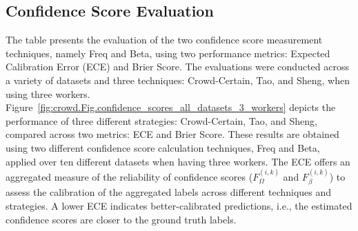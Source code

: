 \documentclass[default]{bst/sn-jnl_mine}%
\begin{document}
\subsection{Confidence Score Evaluation}
The table presents the evaluation of the two confidence score measurement techniques, namely Freq and Beta, using two performance metrics: Expected Calibration Error (ECE) and Brier Score. The evaluations were conducted across a variety of datasets and three techniques: Crowd-Certain, Tao, and Sheng, when using three workers.
Figure~\ref{fig:crowd.Fig.confidence_scores_all_datasets_3_workers} depicts the performance of three different strategies: Crowd-Certain, Tao, and Sheng, compared across two metrics: ECE and Brier Score. These results are obtained using two different confidence score calculation techniques, Freq and Beta, applied over ten different datasets when having three workers. The ECE offers an aggregated measure of the reliability of confidence scores ($F_{\Omega}^{(i,k)}$ and $F_{\beta}^{(i,k)}$) to assess the calibration of the aggregated labels across different techniques and strategies. A lower ECE indicates better-calibrated predictions, i.e., the estimated confidence scores are closer to the ground truth labels.\
\end{document}
